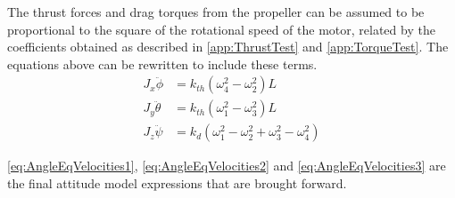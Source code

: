 The thrust forces and drag torques from the propeller can be assumed to be proportional to the square of the rotational speed of the motor, related by the coefficients obtained as described in \autoref{app:ThrustTest} and \ref{app:TorqueTest}. The equations above can be rewritten to include these terms.
%
\begin{align}
J_x \ddot{\phi}&=k_{th} (\omega^2_4-\omega^2_2)  L \label{eq:AngleEqVelocities1}\\
J_y \ddot{\theta}&=k_{th} (\omega^2_1-\omega^2_3)  L \label{eq:AngleEqVelocities2} \\
J_z \ddot{\psi}&=k_d (\omega^2_1-\omega^2_2+\omega^2_3-\omega^2_4)
\label{eq:AngleEqVelocities3}
\end{align}
\begin{where}
\end{where}

\autoref{eq:AngleEqVelocities1}, \autoref{eq:AngleEqVelocities2} 
and \autoref{eq:AngleEqVelocities3} are the final attitude model expressions that are brought forward. %
